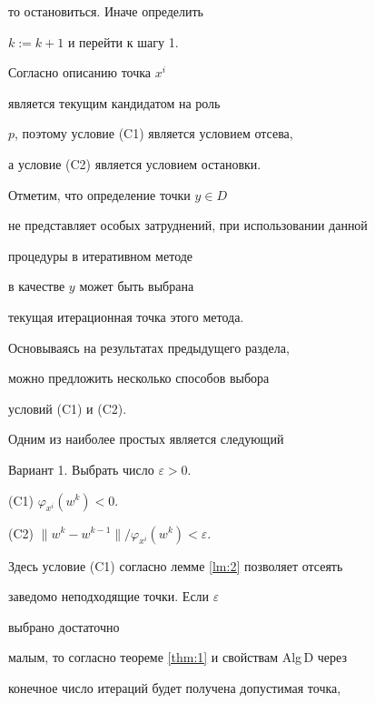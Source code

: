 то остановиться. Иначе определить


$k:=k+1$ и перейти к шагу 1.


\medskip





 Согласно описанию точка $x^{i}$


 является текущим кандидатом на роль


 $p$, поэтому условие (C1) является условием отсева,


 а условие (C2) является условием остановки.


 Отметим, что определение точки $y \in D$


не представляет особых затруднений, при использовании данной


процедуры в итеративном методе


в качестве $y$ может быть выбрана


текущая итерационная точка этого метода.





 Основываясь на результатах предыдущего раздела,


можно предложить несколько способов выбора


условий (C1) и (C2).


Одним из наиболее простых является следующий


\medskip





Вариант 1. Выбрать число $\varepsilon >0$.





(C1) $\varphi_{x^{i}}(w^{k}) < 0$.





(C2) $ \|w^{k}-w^{k-1} \| / \varphi_{x^{i}}(w^{k}) < \varepsilon$.


\medskip





\noindent Здесь условие (C1) согласно лемме \ref{lm:2} позволяет отсеять


 заведомо неподходящие точки. Если $\varepsilon$


 выбрано достаточно


 малым, то согласно теореме \ref{thm:1} и свойствам Alg\,D через


 конечное число итераций будет получена допустимая точка,


